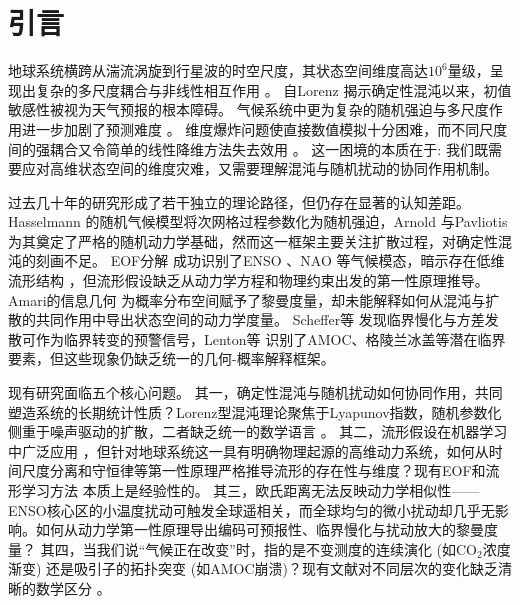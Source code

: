 \section{引言}

地球系统横跨从湍流涡旋到行星波的时空尺度，其状态空间维度高达$10^6$量级，呈现出复杂的多尺度耦合与非线性相互作用 \cite{ghil2008climate,majda2012climate}。
自Lorenz \cite{lorenz1963deterministic}揭示确定性混沌以来，初值敏感性被视为天气预报的根本障碍。
气候系统中更为复杂的随机强迫与多尺度作用进一步加剧了预测难度 \cite{lorenz1969predictability,thompson1957uncertainty}。
维度爆炸问题使直接数值模拟十分困难，而不同尺度间的强耦合又令简单的线性降维方法失去效用 \cite{palmer1993extended,dijkstra2013nonlinear}。
这一困境的本质在于: 我们既需要应对高维状态空间的维度灾难，又需要理解混沌与随机扰动的协同作用机制。

过去几十年的研究形成了若干独立的理论路径，但仍存在显著的认知差距。
Hasselmann \cite{hasselmann1976stochastic}的随机气候模型将次网格过程参数化为随机强迫，Arnold \cite{arnold1998random}与Pavliotis \cite{pavliotis2014stochastic}为其奠定了严格的随机动力学基础，然而这一框架主要关注扩散过程，对确定性混沌的刻画不足。
EOF分解 \cite{hasselmann1988pips}成功识别了ENSO \cite{trenberth1997definition}、NAO \cite{hurrell1995decadal}等气候模态，暗示存在低维流形结构 \cite{fefferman2016testing}，但流形假设缺乏从动力学方程和物理约束出发的第一性原理推导。
Amari的信息几何 \cite{amari2016information,amari1998natural}为概率分布空间赋予了黎曼度量，却未能解释如何从混沌与扩散的共同作用中导出状态空间的动力学度量。
Scheffer等 \cite{scheffer2009early}发现临界慢化与方差发散可作为临界转变的预警信号，Lenton等 \cite{lenton2008tipping}识别了AMOC、格陵兰冰盖等潜在临界要素，但这些现象仍缺乏统一的几何-概率解释框架。

现有研究面临五个核心问题。
其一，确定性混沌与随机扰动如何协同作用，共同塑造系统的长期统计性质？Lorenz型混沌理论聚焦于Lyapunov指数，随机参数化侧重于噪声驱动的扩散，二者缺乏统一的数学语言 \cite{eckmann1985ergodic}。
其二，流形假设在机器学习中广泛应用 \cite{vapnik1999nature}，但针对地球系统这一具有明确物理起源的高维动力系统，如何从时间尺度分离和守恒律等第一性原理严格推导流形的存在性与维度？现有EOF和流形学习方法 \cite{coifman2006diffusion,berry2016variable}本质上是经验性的。
其三，欧氏距离无法反映动力学相似性——ENSO核心区的小温度扰动可触发全球遥相关，而全球均匀的微小扰动却几乎无影响。如何从动力学第一性原理导出编码可预报性、临界慢化与扰动放大的黎曼度量？
其四，当我们说“气候正在改变”时，指的是不变测度的连续演化 (如$\text{CO}_2$浓度渐变) 还是吸引子的拓扑突变 (如AMOC崩溃)？现有文献对不同层次的变化缺乏清晰的数学区分 \cite{ipcc2021ar6,slingo2011uncertainty}。


